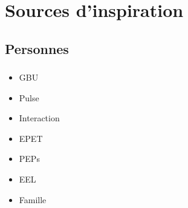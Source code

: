 \section{Sources d'inspiration}

\begin{frame}
\sectionFrame{}
\end{frame}

	\subsection{Personnes}
	
	\begin{frame}
	\frametitle{\insertsubsection}
	
		\begin{itemize}
		\item GBU %
		\item Pulse %
		\item Interaction %
		\item EPET %
		\item PEPs %
		\item EEL %
		\item Famille %
		\end{itemize}
	
	\end{frame}
	
		